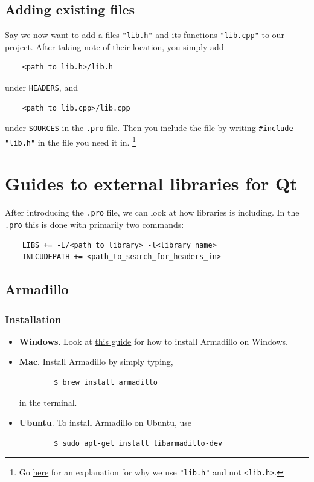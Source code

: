 \documentclass[11pt]{article}
\begin{document}
\subsection{Adding existing files}
Say we now want to add a files \texttt{"lib.h"} and its functions \texttt{"lib.cpp"} to our project. After taking note of their location, you simply add
\begin{lstlisting}
    <path_to_lib.h>/lib.h
\end{lstlisting}
under \texttt{HEADERS}, and 
\begin{lstlisting}
    <path_to_lib.cpp>/lib.cpp
\end{lstlisting}
under \texttt{SOURCES} in the \texttt{.pro} file. Then you include the file by writing \texttt{\#include "lib.h"} in the file you need it in. \footnote{Go \href{https://stackoverflow.com/questions/21593/what-is-the-difference-between-include-filename-and-include-filename}{here} for an explanation for why we use \texttt{"lib.h"} and not \texttt{<lib.h>}.}

\section{Guides to external libraries for Qt}
After introducing the \texttt{.pro} file, we can look at how libraries is including. In the \texttt{.pro} this is done with primarily two commands:
\begin{lstlisting}
    LIBS += -L/<path_to_library> -l<library_name>
    INLCUDEPATH += <path_to_search_for_headers_in>
\end{lstlisting}

\subsection{Armadillo}
\subsubsection{Installation}
\begin{itemize}
    \item \textbf{Windows}. Look at \href{https://d1b10bmlvqabco.cloudfront.net/attach/j6owewp05ym46p/i8xgc5x4yhoyo/j7ayyo45oocq/blas_lapack_solution_windows.pdf}{this guide} for how to install Armadillo on Windows.
    \item \textbf{Mac}. Install Armadillo by simply typing,
    \begin{lstlisting}
        $ brew install armadillo
    \end{lstlisting}
    in the terminal.
    \item \textbf{Ubuntu}. To install Armadillo on Ubuntu, use
    \begin{lstlisting}
        $ sudo apt-get install libarmadillo-dev
    \end{lstlisting}
\end{itemize}
\end{document}
